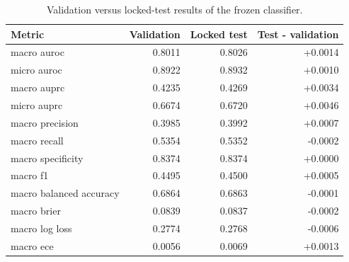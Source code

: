 \begin{table}[t]
\centering
\scriptsize
\begin{tabular}{lrrr}
\hline
Metric & Validation & Locked test & Test - validation \\
\hline
macro auroc & 0.8011 & 0.8026 & +0.0014 \\
micro auroc & 0.8922 & 0.8932 & +0.0010 \\
macro auprc & 0.4235 & 0.4269 & +0.0034 \\
micro auprc & 0.6674 & 0.6720 & +0.0046 \\
macro precision & 0.3985 & 0.3992 & +0.0007 \\
macro recall & 0.5354 & 0.5352 & -0.0002 \\
macro specificity & 0.8374 & 0.8374 & +0.0000 \\
macro f1 & 0.4495 & 0.4500 & +0.0005 \\
macro balanced accuracy & 0.6864 & 0.6863 & -0.0001 \\
macro brier & 0.0839 & 0.0837 & -0.0002 \\
macro log loss & 0.2774 & 0.2768 & -0.0006 \\
macro ece & 0.0056 & 0.0069 & +0.0013 \\
\hline
\end{tabular}
\caption{Validation versus locked-test results of the frozen classifier.}
\label{tab:table3_validation_vs_test}
\end{table}
